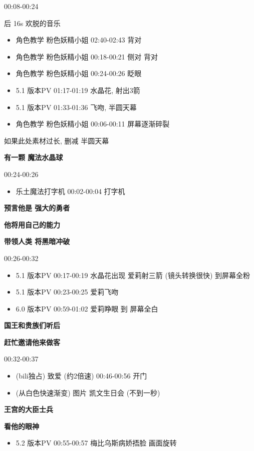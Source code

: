 \documentclass[a4paper]{article}
\begin{document}
00:08-00:24

后 16s 欢脱的音乐

\begin{itemize}
    \item 角色教学 粉色妖精小姐 02:40-02:43 背对
    \item 角色教学 粉色妖精小姐 00:18-00:21 侧对 背对
    \item 角色教学 粉色妖精小姐 00:24-00:26 眨眼
    \item 5.1 版本PV 01:17-01:19 水晶花, 射出3箭
    \item 5.1 版本PV 01:33-01:36 飞吻, 半圆天幕
    \item 角色教学 粉色妖精小姐 00:06-00:11 屏幕逐渐碎裂
\end{itemize}

如果此处素材过长, 删减 半圆天幕

\textbf{有一颗 魔法水晶球}

00:24-00:26

\begin{itemize}
    \item 乐土魔法打字机 00:02-00:04 打字机
\end{itemize}

\textbf{预言他是 强大的勇者}

\textbf{他将用自己的能力}

\textbf{带领人类 将黑暗冲破}

00:26-00:32

\begin{itemize}
    \item 5.1 版本PV 00:17-00:19 水晶花出现 爱莉射三箭 (镜头转换很快) 到屏幕全粉
    \item 5.1 版本PV 00:23-00:25 爱莉飞吻
    \item 6.0 版本PV 00:59-01:02 爱莉睁眼 到 屏幕全白
\end{itemize}

\textbf{国王和贵族们听后}

\textbf{赶忙邀请他来做客}

00:32-00:37

\begin{itemize}
    \item (bili独占) 致爱 (约2倍速) 00:46-00:56 开门
    \item (从白色快速渐变) 图片 凯文生日会 (不到一秒)
\end{itemize}

\textbf{王宫的大臣士兵}

\textbf{看他的眼神}

\begin{itemize}
    \item 5.2 版本PV 00:55-00:57 梅比乌斯病娇捂脸 画面旋转
\end{itemize}
\end{document}
